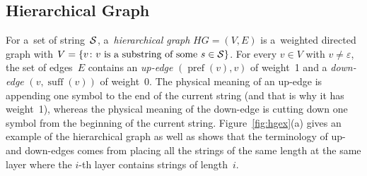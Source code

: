 \documentclass[11pt]{article}
\newtheorem{definition}{Definition}
\DeclareMathOperator{\pref}{pref}
\DeclareMathOperator{\suff}{suff}
\begin{document}
\subsection{Hierarchical Graph}
For a~set of string~${\cal S}$, a~\emph{hierarchical graph} $HG=(V,E)$ is a~weighted directed graph with $V=\{v \colon \text{$v$ is a~substring of some $s \in {\cal S}$}\}$. For every $v \in V$ with $v \neq \varepsilon$, the set of edges~$E$ contains an {\em up-edge} $(\pref(v), v)$ of weight~1 and a {\em down-edge} $(v, \suff(v))$ of weight~0. The physical meaning of an up-edge is appending one symbol to the end of the current string (and that is why it has weight~1), whereas the physical meaning of the down-edge is cutting down one symbol from the beginning of the current string.
%
Figure~\ref{fig:hgex}(a) gives an example of the hierarchical graph as well as shows that the terminology of up- and down-edges comes from placing all the strings of the same length at the same layer where the $i$-th layer contains strings of length~$i$. 


\newcommand{\we}[4]{
\begin{scope}[xshift=#1mm,yshift=#2mm]
\foreach \n/\x/\y in {aaa/0/3, cae/1/3, aec/3/3, eee/4/3}
  \node[inputvertex] (\n) at (\x,\y) {\tt \n};
%  
\foreach \n/\x/\y in {aa/0/2, ca/1/2, ae/2/2, ec/3/2, ee/4/2, a/1/1, c/2/1, e/3/1}
  \node[vertex] (\n) at (\x,\y) {\tt \n};
%
\node[vertex] (eps) at (2,0) {$\varepsilon$};
%
\foreach \f/\t/\a in {eps/e/10, e/eps/10, eps/c/10, c/eps/10, eps/a/10, a/eps/10, a/aa/10, aa/a/10, aa/aaa/10, aaa/aa/10, c/ca/0, ca/cae/0, cae/ae/0, ae/aec/0, aec/ec/0, ee/eee/10, eee/ee/10, e/ee/10, ee/e/10, ca/a/0, a/ae/0, ae/e/0, e/ec/0, ec/c/0}
  \path (\f) edge[hgedge,bend left=\a] (\t);
  
\node at (2,-1) {(#3)};

#4
\end{scope}
}
\end{document}
